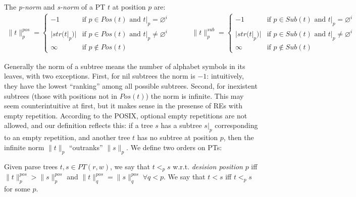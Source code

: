 \documentclass[AMA,STIX1COL]{WileyNJD-v2}
\newcommand{\pnorm}[2]{\|{#1}\|^{pos}_{#2}}
\newcommand{\snorm}[2]{\|{#1}\|^{sub}_{#2}}
\begin{document}
    \begin{definition}\label{tnorm_of_PTs}
    The \emph{p-norm} and \emph{s-norm} of a PT $t$ at position $p$ are:
    \begin{align*}
        \pnorm{t}{p} =
            \begin{cases}
                -1          &\text{if } p \in Pos(t) \text{ and } t|_p = \varnothing^i  \\[-0.2em]
                |str(t|_p)| &\text{if } p \in Pos(t) \text{ and } t|_p \neq \varnothing^i \\[-0.2em]
                \infty      &\text{if } p \not\in Pos(t)
            \end{cases}
    \quad\quad\quad
        \snorm{t}{p} =
            \begin{cases}
                -1          &\text{if } p \in Sub(t) \text{ and } t|_p = \varnothing^i  \\[-0.2em]
                |str(t|_p)| &\text{if } p \in Sub(t) \text{ and } t|_p \neq \varnothing^i \\[-0.2em]
                \infty      &\text{if } p \not\in Sub(t)
            \end{cases}
    \end{align*}
    \end{definition}

Generally the norm of a subtree means the number of alphabet symbols in its leaves, with two exceptions.
First, for nil subtrees the norm is $-1$: intuitively, they have the lowest ``ranking'' among all possible subtrees.
Second, for inexistent subtrees (those with positions not in $Pos(t)$) the norm is infinite.
This may seem counterintuitive at first, but it makes sense in the presense of REs with empty repetition.
According to the POSIX, optional empty repetitions are not allowed, and our definition reflects this:
if a tree $s$ has a subtree $s|_p$ corresponding to an empty repetition,
and another tree $t$ has no subtree at position $p$,
then the infinite norm $\|t\|_p$ ``outranks'' $\|s\|_p$.
We define two orders on PTs:

    \begin{definition}
    \label{total_order_on_PTs}
    Given parse trees $t, s \in PT(r, w)$, we say that $t <_p s$ w.r.t. \emph{desision position} $p$
    iff $\pnorm{t}{p} > \pnorm{s}{p}$ and $\pnorm{t}{q} = \pnorm{s}{q} \; \forall q < p$.
    We say that $t < s$ iff $t <_p s$ for some $p$.
    \end{definition}
\end{document}
